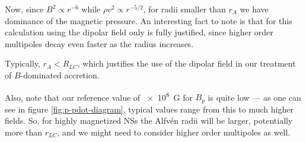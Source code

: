 \documentclass[main.tex]{subfiles}
\begin{document}
Now, since \(B^2 \propto r^{-6}\) while \(\rho v^2 \propto r^{-5/2}\), for radii smaller than \(r_A\) we have dominance of the magnetic pressure. 
An interesting fact to note is that for this calculation using the dipolar field only is fully justified, since higher order multipoles decay even faster as the radius increases.

Typically, \(r_A < R_{LC}\), which justifies the use of the dipolar field in our treatment of \(B\)-dominated accretion.

Also, note that our reference value of \SI{e8}{G} for \(B_p\) is quite low --- as one can see in figure \ref{fig:p-pdot-diagram}, typical values range from this to much higher fields. 
So, for highly magnetized NSs the Alfvén radii will be larger, potentially more than \(r_{LC}\), and we might need to consider higher order multipoles as well.
\end{document}
